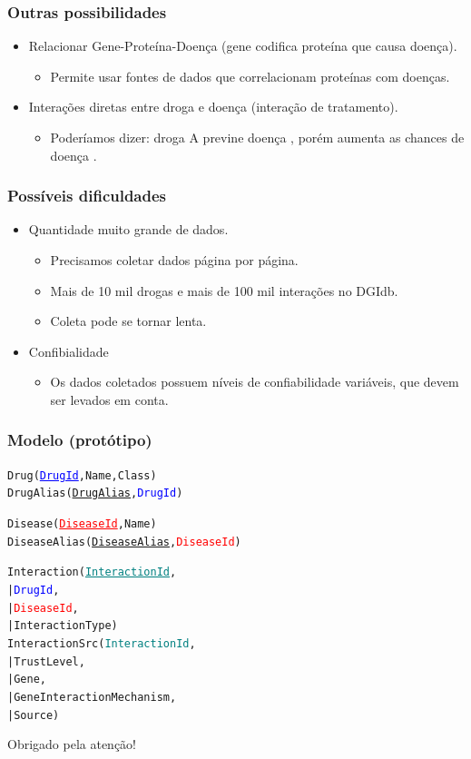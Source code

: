 \documentclass[12pt]{beamer}
\begin{document}
\begin{frame}
  \frametitle{Outras possibilidades}

  \begin{itemize}
    \item<1-> Relacionar Gene-Proteína-Doença (gene codifica proteína que causa doença).
    \begin{itemize}
      \item Permite usar fontes de dados que correlacionam proteínas com doenças.
    \end{itemize}
    \item<2-> Interações diretas entre droga e doença (interação de tratamento).
    \begin{itemize}
      \item Poderíamos dizer: droga A previne doença \textalpha, porém
            aumenta as chances de doença \textgamma.
    \end{itemize}
  \end{itemize}
\end{frame}

\begin{frame}
  \frametitle{Possíveis dificuldades}

  \begin{itemize}
    \item Quantidade muito grande de dados.
          \begin{itemize}
            \item Precisamos coletar dados página por página.
            \item Mais de 10 mil drogas e mais de 100 mil interações no DGIdb.
            \item Coleta pode se tornar lenta.
          \end{itemize}
    \item Confibialidade
          \begin{itemize}
            \item Os dados coletados possuem níveis de confiabilidade
                  variáveis, que devem ser levados em conta.
          \end{itemize}
  \end{itemize}
\end{frame}

\begin{frame}[fragile]
  \frametitle{Modelo (protótipo)}

  \begin{alltt}
    Drug(\textcolor{blue}{\underline{DrugId}}, Name, Class)
    DrugAlias(\underline{DrugAlias}, \textcolor{blue}{DrugId})

    Disease(\textcolor{red}{\underline{DiseaseId}}, Name)
    DiseaseAlias(\underline{DiseaseAlias}, \textcolor{red}{DiseaseId})

    Interaction(\textcolor{teal}{\underline{InteractionId}},
    |           \textcolor{blue}{DrugId},
    |           \textcolor{red}{DiseaseId},
    |           InteractionType)
    InteractionSrc(\textcolor{teal}{InteractionId},
    |              TrustLevel,
    |              Gene,
    |              GeneInteractionMechanism,
    |              Source)
  \end{alltt}
\end{frame}

\begin{frame}
  \centering Obrigado pela atenção!
\end{frame}
\end{document}
